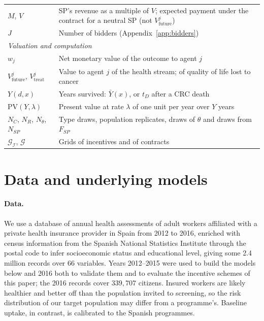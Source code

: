 \documentclass[12pt]{article}
\begin{document}
{\begin{longtable}{l p{13.2cm}}
$M$, $V$ & SP's revenue as a multiple of $V$; expected payment under the contract for a neutral SP (not $V^j_{\text{future}}$) \\
$J$ & Number of bidders (Appendix~\ref{app:bidders}) \\
\midrule
\multicolumn{2}{l}{\emph{Valuation and computation}} \\
$w_j$ & Net monetary value of the outcome to agent $j$ \\
$V^{j}_{\text{future}}$, $V^{j}_{\text{treat}}$ & Value to agent $j$ of the health stream; of quality of life lost to cancer \\
$Y(d, x)$ & Years survived: $\bar Y(x)$, or $t_D$ after a CRC death \\
$\mathrm{PV}(Y, \lambda)$ & Present value at rate $\lambda$ of one unit per year over $Y$ years \\
$N_C$, $N_R$, $N_\theta$, $N_{SP}$ & Type draws, population replicates, draws of $\theta$ and draws from $F_{SP}$ \\
$\mathcal{G}_{\mathcal{I}}$, $\mathcal{G}$ & Grids of incentives and of contracts \\
\end{longtable}}

\section{Data and underlying models}\label{app:models}

\paragraph{Data.} We use a database of annual health assessments of adult workers affiliated with a private health insurance provider in Spain from 2012 to 2016, enriched with census information from the Spanish National Statistics Institute through the postal code to infer socioeconomic status and educational level, giving some 2.4 million records over 66 variables. Years 2012--2015 were used to build the models below and 2016 both to validate them and to evaluate the incentive schemes of this paper; the 2016 records cover $339{,}707$ citizens. Insured workers are likely healthier and better off than the population invited to screening, so the risk distribution of our target population may differ from a programme's. Baseline uptake, in contrast, is calibrated to the Spanish programmes.
\end{document}
